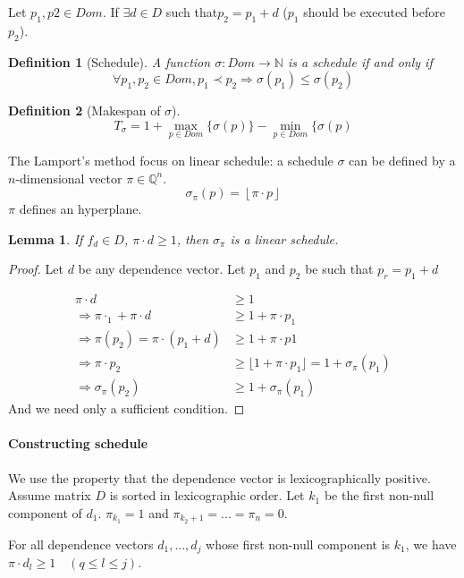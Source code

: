 \documentclass{article}
\newtheorem{lemma}{Lemma}
\newtheorem{defi}{Definition}
\begin{document}
Let $p_1,p2 \in Dom$. If $\exists d \in D$ such that$p_2=p_1 + d$ ($p_1$ should be executed before $p_2$).

\begin{defi}[Schedule]
A function $\sigma : Dom \to \mathbb{N}$ is a schedule if and only if
\[\forall p_1,p_2 \in Dom, p_1\prec p_2 \Rightarrow \sigma(p_1)\leq \sigma(p_2)\]
\end{defi}

\begin{defi}[Makespan of $\sigma$]
\[T_{\sigma}=1+\max_{p\in Dom} \{ \sigma(p)\} - \min_{p\in Dom}\{ \sigma(p)\]
\end{defi}

The Lamport's method focus on linear schedule: a schedule $\sigma$ can be defined by a $n$-dimensional vector $\pi \in \mathbb{Q}^n$.
\[\sigma_\pi(p) = \left\lfloor \pi \cdot p \right\rfloor\]
$\pi$ defines an hyperplane.

\begin{lemma}
If $f_d\in D$, $\pi\cdot d \geq 1$, then $\sigma_\pi$ is a linear schedule.
\end{lemma}

\begin{proof}
Let $d$ be any dependence vector. Let $p_1$ and $p_2$ be such that $p_r=p_1+d$

\begin{align*}
\pi \cdot d & \geq 1\\
\Rightarrow \pi\cdotp_1 + \pi \cdot d & \geq 1 + \pi \cdot p_1\\
\Rightarrow \pi(p_2)=\pi\cdot(p_1+d) & \geq 1 + \pi \cdot p1\\
\Rightarrow \pi\cdot p_2 & \geq \lfloor 1 + \pi \cdot p_1 \rfloor = 1 + \sigma_\pi(p_1)\\
\Rightarrow \sigma_\pi(p_2) & \geq 1 + \sigma_\pi(p_1)
\end{align*}
And we need only a sufficient condition.
\end{proof}

\paragraph{Constructing schedule}
We use the property that the dependence vector is lexicographically positive. Assume matrix $D$ is sorted in lexicographic order. Let $k_1$ be the first non-null component of $d_1$. $\pi_{k_1}=1$ and $\pi_{k_{2}+1}=...=\pi_n=0$.

For all dependence vectors $d_1,...,d_j$ whose first non-null component is $k_1$, we have $\pi \cdot d_l \geq 1\quad (q\leq l \leq j)$.
\end{document}
